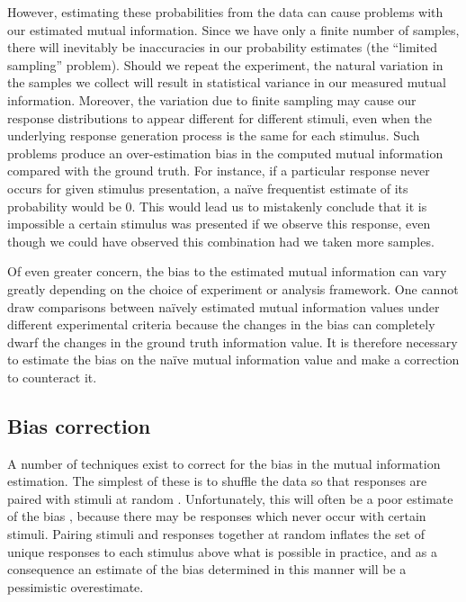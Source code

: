 However, estimating these probabilities from the data can cause problems with our estimated mutual information.
Since we have only a finite number of samples, there will inevitably be inaccuracies in our probability estimates (the ``limited sampling'' problem).
Should we repeat the experiment, the natural variation in the samples we collect will result in statistical variance in our measured mutual information.
Moreover, the variation due to finite sampling may cause our response distributions to appear different for different stimuli, even when the underlying response generation process is the same for each stimulus.
Such problems produce an over-estimation bias in the computed mutual information compared with the ground truth.
For instance, if a particular response never occurs for given stimulus presentation, a na{\"i}ve frequentist estimate of its probability would be $0$.
This would lead us to mistakenly conclude that it is impossible a certain stimulus was presented if we observe this response, even though we could have observed this combination had we taken more samples.

Of even greater concern, the bias to the estimated mutual information can vary greatly depending on the choice of experiment or analysis framework.
One cannot draw comparisons between na{\"i}vely estimated mutual information values under different experimental criteria because the changes in the bias can completely dwarf the changes in the ground truth information value.
It is therefore necessary to estimate the bias on the na{\"i}ve mutual information value and make a correction to counteract it.


\subsection{Bias correction}
\label{sec:info-bias}

A number of techniques exist to correct for the bias in the mutual information estimation.
The simplest of these is to shuffle the data so that responses are paired with stimuli at random \citep{Optican1991}.
Unfortunately, this will often be a poor estimate of the bias \citep{Panzeri1996}, because there may be responses which never occur with certain stimuli.
Pairing stimuli and responses together at random inflates the set of unique responses to each stimulus above what is possible in practice, and as a consequence an estimate of the bias determined in this manner will be a pessimistic overestimate.

